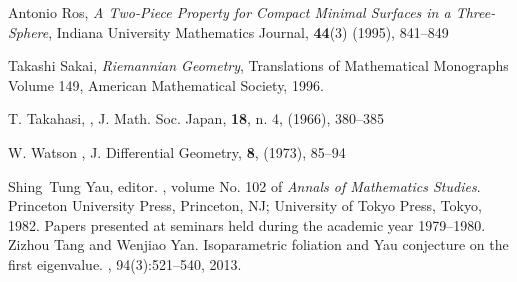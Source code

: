 \documentclass[11pt,letterpaper]{amsart}
\theoremstyle{definition}
\theoremstyle{remark}
\begin{document}
\begin{thebibliography}{10}
 Antonio Ros,
\textit{A Two-Piece Property for Compact Minimal Surfaces in a Three-Sphere}, Indiana University Mathematics Journal, \textbf{44}(3) (1995), 841--849

 Takashi Sakai, \textit{Riemannian Geometry}, Translations
of Mathematical Monographs Volume 149, American Mathematical
Society, 1996.

 T. Takahasi, 
,
\newblock J. Math. Soc. Japan, \textbf{18}, n. 4, (1966), 380--385

 W. Watson 
,
\newblock J. Differential Geometry, \textbf{8}, (1973), 85--94

Shing~Tung Yau, editor.
, volume No. 102 of {\em
  Annals of Mathematics Studies}.
\newblock Princeton University Press, Princeton, NJ; University of Tokyo Press,
  Tokyo, 1982.
\newblock Papers presented at seminars held during the academic year
  1979--1980.
Zizhou Tang and Wenjiao Yan.
\newblock Isoparametric foliation and {Y}au conjecture on the first eigenvalue.
, 94(3):521--540, 2013.

\end{thebibliography}
\end{document}
